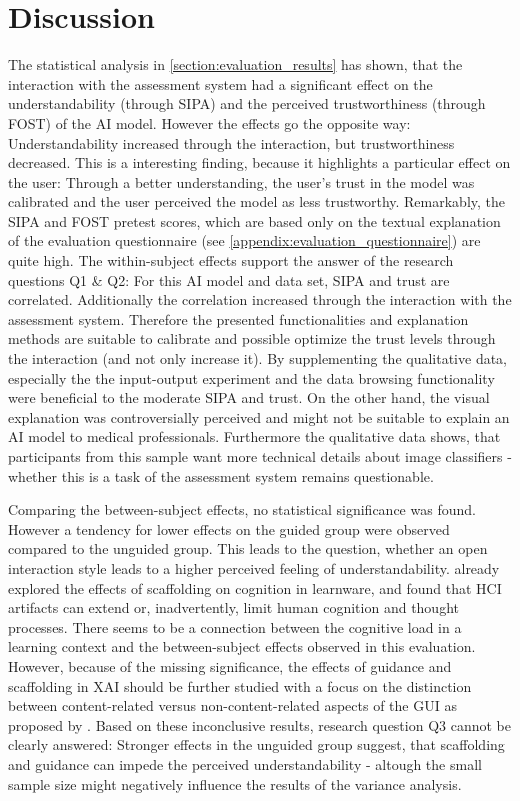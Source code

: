\documentclass[11pt,a4paper,english]{scrreprt}
\begin{document}
\section{Discussion}\label{section:evaluation_discussion}
The statistical analysis in \autoref{section:evaluation_results} has shown, that the interaction with the assessment system had a significant effect on the understandability (through SIPA) and the perceived trustworthiness (through FOST) of the AI model. However the effects go the opposite way: Understandability increased through the interaction, but trustworthiness decreased. This is a interesting finding, because it highlights a particular effect on the user: Through a better understanding, the user's trust in the model was calibrated and the user perceived the model as less trustworthy. Remarkably, the SIPA and FOST pretest scores, which are based only on the textual explanation of the evaluation questionnaire (see \autoref{appendix:evaluation_questionnaire}) are quite high. The within-subject effects support the answer of the research questions Q1 \& Q2: For this AI model and data set, SIPA and trust are correlated. Additionally the correlation increased through the interaction with the assessment system. Therefore the presented functionalities and explanation methods are suitable to calibrate and possible optimize the trust levels through the interaction (and not only increase it). By supplementing the qualitative data, especially the the input-output experiment and the data browsing functionality were beneficial to the moderate SIPA and trust. On the other hand, the visual explanation was controversially perceived and might not be suitable to explain an AI model to medical professionals. Furthermore the qualitative data shows, that participants from this sample want more technical details about image classifiers - whether this is a task of the assessment system remains questionable.

Comparing the between-subject effects, no statistical significance was found. However a tendency for lower effects on the guided group were observed compared to the unguided group. This leads to the question, whether an open interaction style leads to a higher perceived feeling of understandability. \textcite{sedig_role_2001} already explored the effects of scaffolding on cognition in learnware, and found that HCI artifacts can extend or, inadvertently, limit human cognition and thought processes. There seems to be a connection between the cognitive load in a learning context and the between-subject effects observed in this evaluation. However, because of the missing significance, the effects of guidance and scaffolding in XAI should be further studied with a focus on the distinction between content-related versus non-content-related aspects of the GUI as proposed by \textcite{sedig_role_2001}. Based on these inconclusive results, research question Q3 cannot be clearly answered: Stronger effects in the unguided group suggest, that scaffolding and guidance can impede the perceived understandability - altough the small sample size might negatively influence the results of the variance analysis.
\end{document}
